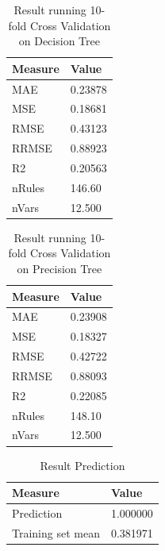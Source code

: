 \documentclass{article}
\begin{document}
\begin{table}[H]
	\centering
	\caption{Result running 10-fold Cross Validation on Decision Tree}
	\label{tab:Key-Indicator-DT}
	\begin{tabular}{|l|l|}
		\hline
		\textbf{Measure} & \textbf{Value} \\ \hline
		MAE       		& 0.23878 \\ \hline
		MSE       		& 0.18681 \\ \hline
		RMSE       		& 0.43123 \\ \hline
		RRMSE       	& 0.88923 \\ \hline
		R2       		& 0.20563 \\ \hline
		nRules       	& 146.60  \\ \hline
		nVars       	& 12.500  \\ \hline
	\end{tabular}
\end{table}

\begin{table}[H]
	\centering
	\caption{Result running 10-fold Cross Validation on Precision Tree}
	\label{tab:Key-Indicator-PT}
	\begin{tabular}{|l|l|}
		\hline
		\textbf{Measure} 	& \textbf{Value} \\ \hline
		MAE       			& 0.23908 		 \\ \hline
		MSE       			& 0.18327 		 \\ \hline
		RMSE       			& 0.42722		 \\ \hline
		RRMSE       		& 0.88093 	  	 \\ \hline
		R2       			& 0.22085  	 	 \\ \hline
		nRules       		& 148.10   		 \\ \hline
		nVars       		& 12.500   		 \\ \hline
	\end{tabular}
\end{table}

\begin{table}[H]
	\centering
	\caption{Result Prediction}
	\label{tab:Result-Prediction}
	\begin{tabular}{|l|l|}
		\hline
		\textbf{Measure}    & \textbf{Value} \\ \hline
		Prediction       	& 1.000000 	  	 \\ \hline
		Training set mean   & 0.381971 	  	 \\ \hline
	\end{tabular}
\end{table}
\end{document}
